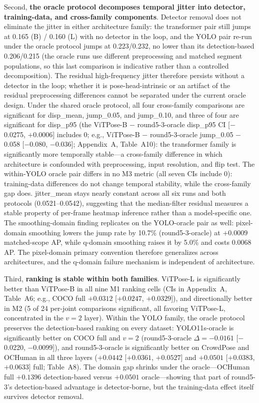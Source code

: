 \documentclass[10pt,conference]{IEEEtran}
\begin{document}
Second, \textbf{the oracle protocol decomposes temporal jitter into detector, training-data, and cross-family components}. Detector removal does not eliminate the jitter in either architecture family: the transformer pair still jumps at 0.165 (B) / 0.160 (L) with no detector in the loop, and the YOLO pair re-run under the oracle protocol jumps at 0.223/0.232, no lower than its detection-based 0.206/0.215 (the oracle runs use different preprocessing and matched segment populations, so this last comparison is indicative rather than a controlled decomposition). The residual high-frequency jitter therefore persists without a detector in the loop; whether it is pose-head-intrinsic or an artifact of the residual preprocessing differences cannot be separated under the current oracle design. Under the shared oracle protocol, all four cross-family comparisons are significant for disp\_mean, jump\_0.05, and jump\_0.10, and three of four are significant for disp\_p95 (the ViTPose-B $-$ round5-3-oracle disp\_p95 CI [$-$0.0275, $+0.0006]$ includes 0; e.g., ViTPose-B $-$ round5-3-oracle jump\_0.05 $-$0.058 [$-$0.080, $-$0.036]; Appendix~A, Table~A10): the transformer family is significantly more temporally stable---a cross-family difference in which architecture is confounded with preprocessing, input resolution, and flip test. The within-YOLO oracle pair differs in no M3 metric (all seven CIs include 0): training-data differences do not change temporal stability, while the cross-family gap does. jitter\_mean stays nearly constant across all six runs and both protocols (0.0521--0.0542), suggesting that the median-filter residual measures a stable property of per-frame heatmap inference rather than a model-specific one. The smoothing-domain finding replicates on the YOLO-oracle pair as well: pixel-domain smoothing lowers the jump rate by 10.7\% (round5-3-oracle) at $+0.0009$ matched-scope AP, while q-domain smoothing raises it by 5.0\% and costs 0.0068 AP. The pixel-domain primary convention therefore generalizes across architectures, and the q-domain failure mechanism is independent of architecture.

Third, \textbf{ranking is stable within both families}. ViTPose-L is significantly better than ViTPose-B in all nine M1 ranking cells (CIs in Appendix~A, Table~A6; e.g., COCO full $+0.0312$ [$+0.0247$, $+0.0329$]), and directionally better in M2 (5 of 24 per-joint comparisons significant, all favoring ViTPose-L, concentrated in the $v{=}2$ layer). Within the YOLO family, the oracle protocol preserves the detection-based ranking on every dataset: YOLO11s-oracle is significantly better on COCO full and $v{=}2$ (round5-3-oracle $\Delta=-0.0161$ [$-$0.0220, $-$0.0099]), and round5-3-oracle is significantly better on CrowdPose and OCHuman in all three layers ($+0.0442$ [$+0.0361$, $+0.0527$] and $+0.0501$ [$+0.0383$, $+0.0633$] full; Table~A8). The domain gap shrinks under the oracle---OCHuman full $+0.1396$ detection-based versus $+0.0501$ oracle---showing that part of round5-3's detection-based advantage is detector-borne, but the training-data effect itself survives detector removal.
\end{document}
